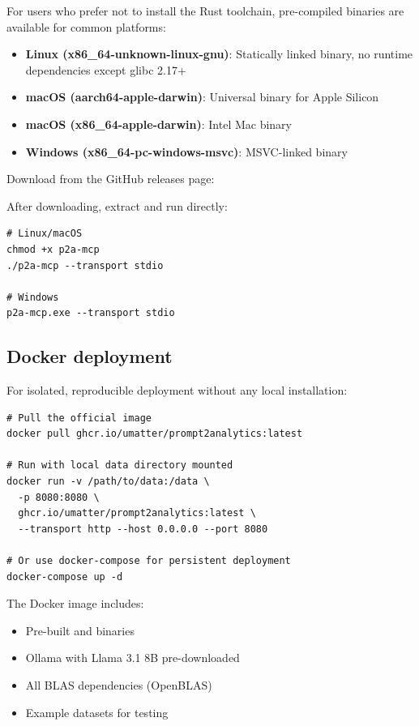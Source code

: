 For users who prefer not to install the Rust toolchain, pre-compiled binaries
are available for common platforms:

\begin{itemize}
  \item \textbf{Linux (x86\_64-unknown-linux-gnu)}: Statically linked binary,
    no runtime dependencies except glibc 2.17+
  \item \textbf{macOS (aarch64-apple-darwin)}: Universal binary for Apple Silicon
  \item \textbf{macOS (x86\_64-apple-darwin)}: Intel Mac binary
  \item \textbf{Windows (x86\_64-pc-windows-msvc)}: MSVC-linked binary
\end{itemize}

\noindent Download from the GitHub releases page:

After downloading, extract and run directly:
\begin{verbatim}
# Linux/macOS
chmod +x p2a-mcp
./p2a-mcp --transport stdio

# Windows
p2a-mcp.exe --transport stdio
\end{verbatim}

\subsection{Docker deployment}

For isolated, reproducible deployment without any local installation:

\begin{verbatim}
# Pull the official image
docker pull ghcr.io/umatter/prompt2analytics:latest

# Run with local data directory mounted
docker run -v /path/to/data:/data \
  -p 8080:8080 \
  ghcr.io/umatter/prompt2analytics:latest \
  --transport http --host 0.0.0.0 --port 8080

# Or use docker-compose for persistent deployment
docker-compose up -d
\end{verbatim}

The Docker image includes:
\begin{itemize}
  \item Pre-built  and  binaries
  \item Ollama with Llama 3.1 8B pre-downloaded
  \item All BLAS dependencies (OpenBLAS)
  \item Example datasets for testing
\end{itemize}

